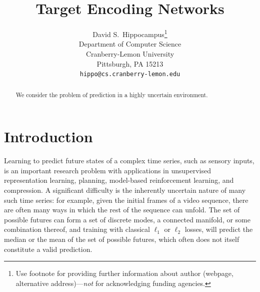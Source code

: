 \documentclass{article}
\title{Target Encoding Networks}
\author{
  David S.~Hippocampus\thanks{Use footnote for providing further
    information about author (webpage, alternative
    address)---\emph{not} for acknowledging funding agencies.} \\
  Department of Computer Science\\
  Cranberry-Lemon University\\
  Pittsburgh, PA 15213 \\
  \texttt{hippo@cs.cranberry-lemon.edu} \\
}
\begin{document}

\maketitle

\begin{abstract}
  We consider the problem of prediction in a highly uncertain environment.
\end{abstract}


\section{Introduction}

Learning to predict future states of a complex time series, such as sensory inputs, is an important research problem with applications in unsupervised representation learning, planning, model-based reinforcement learning, and compression.
A significant difficulty is the inherently uncertain nature of many such time series: for example, given the initial frames of a video sequence, there are often many ways in which the rest of the sequence can unfold.
The set of possible futures can form a set of discrete modes, a connected manifold, or some combination thereof, and training with classical $\ell_1$ or $\ell_2$ losses, will predict the median or the mean of the set of possible futures, which often does not itself constitute a valid prediction.
\end{document}
